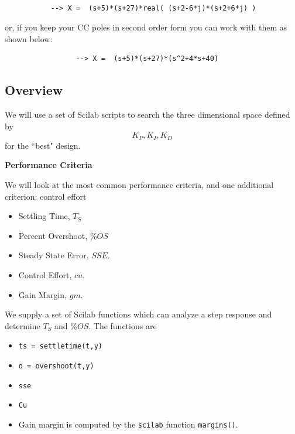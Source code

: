 \begin{verbatim}

           --> X =  (s+5)*(s+27)*real( (s+2-6*j)*(s+2+6*j) )
\end{verbatim}

or, if you keep your CC poles in second order form you can work with them as shown below:

\begin{verbatim}
                 --> X =  (s+5)*(s+27)*(s^2+4*s+40)
\end{verbatim}




\subsection{Overview}

We will use a set of Scilab scripts to search the three dimensional space defined by
\[
K_P,K_I, K_D
\]
for the ``best" design.






{\bf Performance Criteria}



We will look at the most common performance criteria, and one additional criterion: control effort
\begin{itemize}
  \item Settling Time, $T_S$
  \item Percent Overshoot, $\%OS$
  \item Steady State Error, $SSE$.
  \item Control Effort, $cu$.
  \item Gain Margin, $gm$.
\end{itemize}





We supply a set of Scilab functions which can analyze a step response and determine $T_S$ and $\%OS$.  The functions are
\begin{itemize}
  \item {\tt ts = settletime(t,y)}
  \item {\tt o = overshoot(t,y)}
  \item {\tt sse }
  \item {\tt Cu  }
  \item Gain margin is computed by the {\tt scilab} function {\tt margins()}.
\end{itemize}

